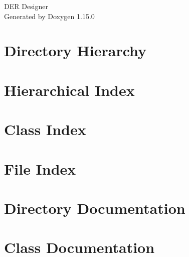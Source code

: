 \documentclass[twoside]{book}
\newcommand{\+}{\discretionary{\mbox{\scriptsize$\hookleftarrow$}}{}{}}
\newcommand{\clearemptydoublepage}{%
    \newpage{\pagestyle{empty}\cleardoublepage}%
  }
\begin{document}
  \raggedbottom
    \hypersetup{pageanchor=false,
                bookmarksnumbered=true,
                pdfencoding=unicode
               }
  \begin{titlepage}
  \vspace*{7cm}
  \begin{center}%
  {\Large DER Designer}\\
  \vspace*{1cm}
  {\large Generated by Doxygen 1.15.0}\\
  \end{center}
  \end{titlepage}
  \clearemptydoublepage
  \tableofcontents
  \clearemptydoublepage
  \hypersetup{pageanchor=true}
\chapter{Directory Hierarchy}

\chapter{Hierarchical Index}

\chapter{Class Index}

\chapter{File Index}

\chapter{Directory Documentation}



\chapter{Class Documentation}






























\end{document}
